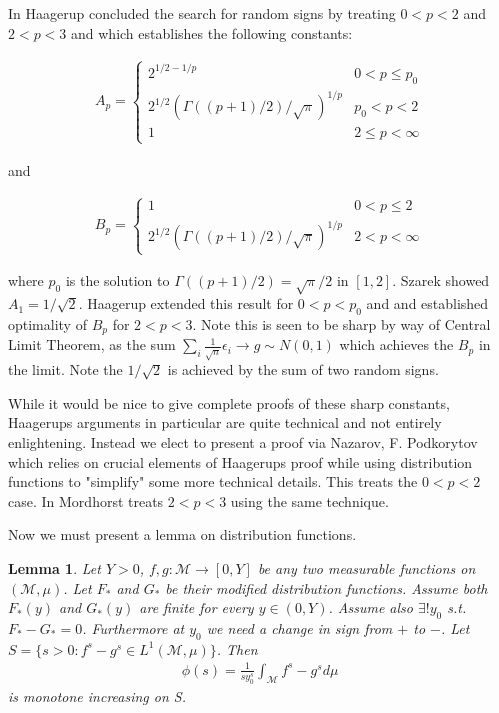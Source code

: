 \documentclass[10pt]{article}
\newcommand{\1}{\textbf{1}}
\newtheorem{lemma}[theorem]{Lemma}
\theoremstyle{remark}
\theoremstyle{definition}
\begin{document}

In \cite{H} Haagerup concluded the search for random signs by treating $0 < p < 2$ and $2 < p < 3$ and which establishes the following constants:


\begin{align*}
	A_p = 
	\begin{cases}
		2^{1/2-1/p} & 0 < p \leq p_0 \\
		2^{1/2}(\Gamma((p+1)/2)/\sqrt{\pi})^{1/p} & p_0 < p < 2\\
		1 & 2 \leq p < \infty
	\end{cases}
\end{align*}

and 

\begin{align*}
	B_p = 
	\begin{cases}
		1 & 0 < p \leq 2\\
		2^{1/2}(\Gamma((p+1)/2)/\sqrt{\pi})^{1/p} & 2 < p < \infty
	\end{cases}
\end{align*}

where $p_0$ is the solution to $\Gamma((p+1)/2) = \sqrt{\pi}/2$ in $[1,2]$. Szarek \cite{S} showed $A_1 = 1/\sqrt{2}$. Haagerup extended this result for $0 < p < p_0$ and and established optimality of $B_p$ for $2 < p <3$. Note this is seen to be sharp by way of Central Limit Theorem, as the sum $\sum_i \frac{1}{\sqrt{n}}\epsilon_i \to g \sim N(0,1)$ which achieves the $B_p$ in the limit. Note the $1/\sqrt{2}$ is achieved by the sum of two random signs.

While it would be nice to give complete proofs of these sharp constants, Haagerups arguments in particular are quite technical and not entirely enlightening. Instead we elect to present a proof via Nazarov, F. Podkorytov \cite{NP} which relies on crucial elements of Haagerups proof while using distribution functions to "simplify" some more technical details. This treats the $0 < p <2$ case. In \cite{M} Mordhorst treats $2 < p < 3$ using the same technique.

Now we must present a lemma on distribution functions.

\begin{lemma}
	Let $Y > 0$, $f,g : \mathcal{M} \to [0,Y]$ be any two measurable functions on $(\mathcal{M},\mu)$. Let $F_*$ and $G_*$ be their modified distribution functions. Assume both $F_*(y)$ and $G_*(y)$ are finite for every $y \in (0,Y)$. Assume also $\exists ! y_0$ s.t. $F_*-G_* = 0$. Furthermore at $y_0$ we need a change in sign from $+$ to $-$. Let $S = \{s > 0: f^s - g^s \in L^1(\mathcal{M},\mu)\}$. Then
	\begin{align*}
		\phi(s) = \frac{1}{sy_0^s}\int_{\mathcal{M}}f^s - g^s d\mu
	\end{align*}
	is monotone increasing on S. 
\end{lemma}
\end{document}

